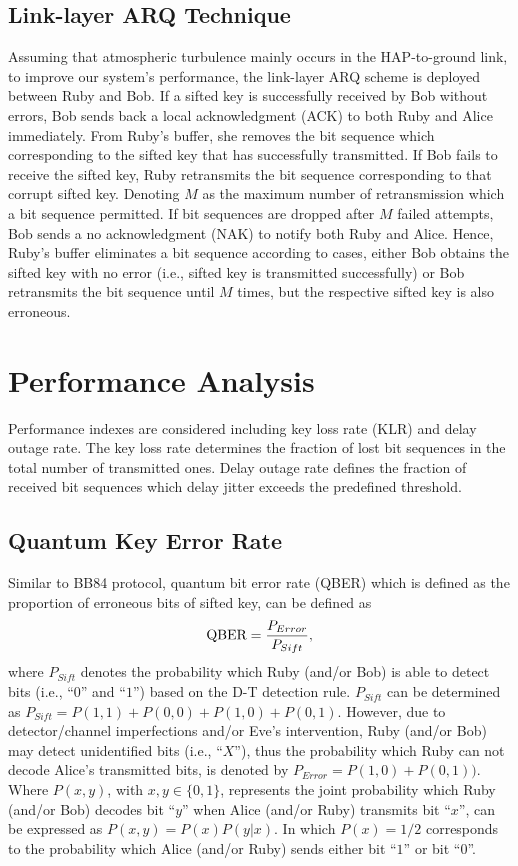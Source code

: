 \documentclass[conference]{IEEEtran}
\begin{document}
\subsection{Link-layer ARQ Technique}
Assuming that atmospheric turbulence mainly occurs in the HAP-to-ground link, to improve our system's performance, the link-layer ARQ scheme is deployed between Ruby and Bob. If a sifted key is successfully received by Bob without errors, Bob sends back a local acknowledgment (ACK) to both Ruby and Alice immediately. From Ruby's buffer, she removes the bit sequence which corresponding to the sifted key that has successfully transmitted. If Bob fails to receive the sifted key, Ruby retransmits the bit sequence corresponding to that corrupt sifted key. Denoting $M$ as the maximum number of retransmission which a bit sequence permitted. If bit sequences are dropped after $M$ failed attempts, Bob sends a no acknowledgment (NAK) to notify both Ruby and Alice. Hence, Ruby's buffer eliminates a bit sequence according to cases, either Bob obtains the sifted key with no error (i.e., sifted key is transmitted successfully) or Bob retransmits the bit sequence until $M$ times, but the respective sifted key is also erroneous.

\section{Performance Analysis}
\label{sect:PerformanceAnalysis}
Performance indexes are considered including key loss rate (KLR) and delay outage rate. The key loss rate determines the fraction of lost bit sequences in the total number of transmitted ones. Delay outage rate defines the fraction of received bit sequences which delay jitter exceeds the predefined threshold.      

\subsection{Quantum Key Error Rate}
Similar to BB84 protocol, quantum bit error rate (QBER) which is defined as the proportion of erroneous bits of sifted key, can be defined as \cite{Gisin2002}
\begin{equation}
	\textnormal{QBER}=\frac{P_{Error}}{P_{Sift}},
\end{equation}
where $P_{Sift}$ denotes the probability which Ruby (and/or Bob) is able to detect bits (i.e., \enquote{$0$} and \enquote{$1$}) based on the D-T detection rule. $P_{Sift}$ can be determined as $P_{Sift}\!\!\!=\!\!\!P(1,1)\!\!+\!\!P(0,0)\!\!+\!\!P(1,0)\!\!+\!\!P(0,1)$. However, due to detector/channel imperfections and/or Eve's intervention, Ruby (and/or Bob) may detect unidentified bits (i.e., \enquote{$X$}), thus the probability which Ruby can not decode Alice's transmitted bits, is denoted by $P_{Error}\!\!=\!\!P(1,0)\!\!+\!\!P(0,1))$. Where $P(x,y)$, with $x,y \!\in\! \{ 0,1\}$, represents the joint probability which Ruby (and/or Bob) decodes bit \enquote{$y$} when Alice (and/or Ruby) transmits bit \enquote{$x$}, can be expressed as $P(x,y)=P(x)P(y|x)$. In which $P(x)=1/2$ corresponds to the probability which Alice (and/or Ruby) sends either bit \enquote{$1$} or bit \enquote{$0$}. 
\end{document}
